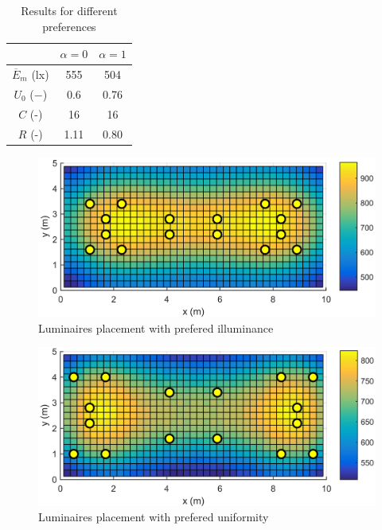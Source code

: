 \begin{table}[tb]
	\renewcommand{\arraystretch}{1.3}
	\caption{Results for different preferences}
 	\label{tab:preferences}
	\centering
  \begin{tabular}{| c | c | c |}
    \hline
    & $\alpha = 0$ & $\alpha = 1$ \\
    \hline
    $\overline{E}_{m}$ (lx) & 555 & 504 \\
    \hline
		$U_0$ ($-$)& 0.6 & 0.76 \\
    \hline
		$C$ (-) & 16 & 16 \\
	\hline
		$R$ (-) & 1.11 & 0.80 \\
  \hline
  \end{tabular}
\end{table}
\begin{figure}[tb]
  \centering
  \includegraphics[width=\columnwidth]{../Vysledky/MSTR_SLB_4x18W_5G4_Fit2_E_V010_S1}
  \caption{Luminaires placement with prefered illuminance}
  \label{fig:V010_S1_E}
\end{figure}
\begin{figure}[tb]
  \centering
  \includegraphics[width=\columnwidth]{../Vysledky/MSTR_SLB_4x18W_5G4_Fit2_U_V010_S1}
  \caption{Luminaires placement with prefered uniformity}
  \label{fig:V010_S1_U}
\end{figure}

